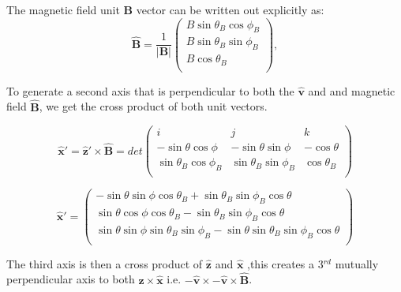 \documentclass[11pt]{article}
\begin{document}
The magnetic field unit $\mathbf{{B}}$ vector can be written out explicitly as:
\begin{equation}
   \mathbf{\hat{B}}=\frac{1}{\mathbf{|{B}|}} \left(
    \begin{array}{c}
    B\sin\theta_B \cos\phi_B \\ 	
    B\sin\theta_B \sin\phi_B \\ 
    B\cos\theta_B\\
\end{array} 
\right),  %
\end{equation}

To generate a second axis that is perpendicular to both the $\mathbf{\hat{v}}$ and and magnetic field  $\mathbf{\hat{B}}$, we get the cross product of both unit vectors.

\begin{equation}
    \mathbf{\hat{x}'} =\mathbf{\hat{z}'}\times \mathbf{\hat{B}} = det \left(
    \begin{array}{ccc}
    i & j & k \\ 	
   - \sin\theta \cos\phi & -\sin\theta \sin\phi  & -\cos\theta \\ 
     \sin\theta_B\cos\phi_B& \sin\theta_B\sin\phi_B  & \cos\theta_B\\
\end{array} 
\right)
\end{equation}

\begin{equation}
   \mathbf{\hat{x}'}=\left(
    \begin{array}{c}
   -\sin\theta\sin\phi\cos\theta_B + \sin\theta_B\sin\phi_B\cos\theta\\ 	
    \sin\theta\cos\phi\cos\theta_B - \sin\theta_B\sin\phi_B\cos\theta\\ 

    \sin\theta\sin\phi\sin\theta_B\sin\phi_B - \sin\theta\sin\theta_B\sin\phi_B\cos\theta\\
\end{array} 
\right) 
\end{equation}

The third axis is then a cross product of   $\mathbf{\hat{z}}$ and $\mathbf{\hat{x}}$ ,this creates a 3$^{rd}$ mutually perpendicular axis to both $\mathbf{\hat{z}} \times \mathbf{\hat{x}} $  i.e. $\mathbf{-\hat{v}} \times\mathbf{-\hat{v}}\times \mathbf{\hat{B}}$. 



\end{document}
